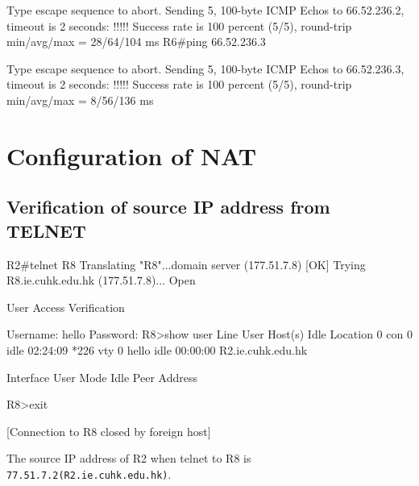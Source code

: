 \documentclass[10pt]{article}
\begin{document}
\begin{itemize}
\begin{verbatim*}
Type escape sequence to abort.
Sending 5, 100-byte ICMP Echos to 66.52.236.2, timeout is 2 seconds:
!!!!!
Success rate is 100 percent (5/5), round-trip min/avg/max = 28/64/104 ms
R6#ping 66.52.236.3

Type escape sequence to abort.
Sending 5, 100-byte ICMP Echos to 66.52.236.3, timeout is 2 seconds:
!!!!!
Success rate is 100 percent (5/5), round-trip min/avg/max = 8/56/136 ms
\end{verbatim*}
\end{itemize}
\section{Configuration of NAT}
\subsection{Verification of source IP address from TELNET}
\begin{verbatim*}
R2#telnet R8
Translating "R8"...domain server (177.51.7.8) [OK]
Trying R8.ie.cuhk.edu.hk (177.51.7.8)... Open


User Access Verification

Username: hello
Password:
R8>show user
Line       User       Host(s)              Idle       Location
0 con 0                idle                 02:24:09
*226 vty 0     hello      idle                 00:00:00 R2.ie.cuhk.edu.hk

Interface    User               Mode         Idle     Peer Address

R8>exit

[Connection to R8 closed by foreign host]
\end{verbatim*}
The source IP address of R2 when telnet to R8 is {\tt 77.51.7.2(R2.ie.cuhk.edu.hk)}.
\end{document}
